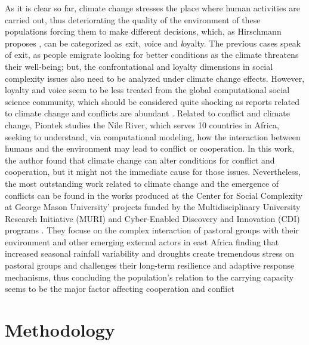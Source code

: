 \documentclass[doc,12pt,floatsintext]{apa7}
\begin{document}
As it is clear so far, climate change stresses the place where human activities are carried out, thus deteriorating the quality of the environment of these populations forcing them to make different decisions, which, as Hirschmann proposes \parencite{hirschman_exit_1970}, can be categorized as {\emph exit}, {\emph voice} and {\emph loyalty}. The previous cases speak of exit, as people emigrate looking for better conditions as the climate threatens their well-being; but, the confrontational and loyalty dimensions in social complexity issues also need to be analyzed under climate change effects. However, loyalty and voice seem to be less treated from the global computational social science community, which should be considered quite shocking as reports related to climate change and conflicts are abundant \parencite{hendrix_climate_2012,hsiang_quantifying_2013,steinbruner_climate_2013}. Related to conflict and climate change, Piontek \parencite{piontek_impact_2010} studies the Nile River, which serves 10 countries in Africa, seeking to understand, via computational modeling, how the interaction between humans and the environment may lead to conflict or cooperation. In this work, the author found that climate change can alter conditions for conflict and cooperation, but it might not the immediate cause for those issues. Nevertheless, the most outstanding work related to climate change and the emergence of conflicts can be found in the works produced at the Center for Social Complexity at George Mason University' projects funded by the Multidisciplinary University Research Initiative (MURI) and Cyber-Enabled Discovery and Innovation (CDI) programs \parencite{cioffi-revilla2010,hailegiorgis_agent_2010,kennedy_agent-based_2010}. They focuse on the complex interaction of pastoral groups with their environment and other emerging external actors in east Africa finding that increased seasonal rainfall variability and droughts create tremendous stress on pastoral groups and challenges their long-term resilience and adaptive response mechanisms, thus concluding the population's relation to the carrying capacity seems to be the major factor affecting cooperation and conflict
% 




\section{Methodology}
\end{document}
